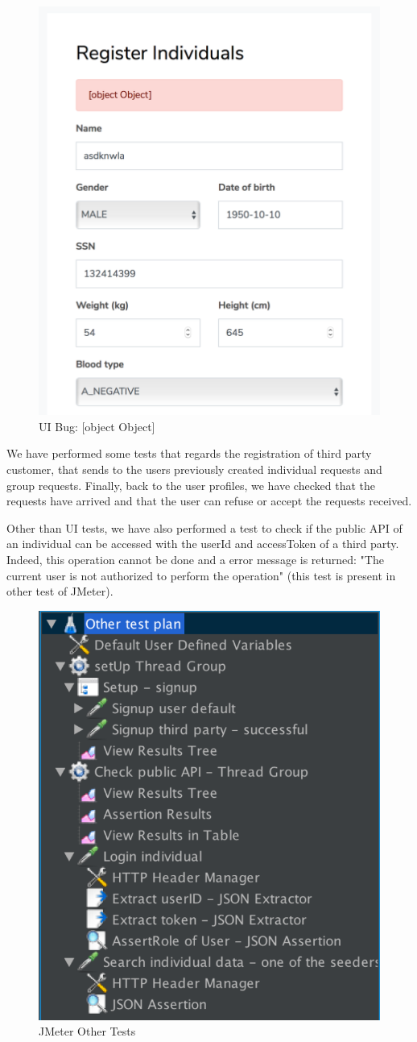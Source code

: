 \begin{figure}[H]
\includegraphics[width=0.7\linewidth]{images/objectError}
\centering
\caption{ UI Bug: [object Object] }
\label{fig:bugobject}
\end{figure}

We have performed some tests that regards the registration of third party customer, that sends to the users previously
created individual requests and group requests. Finally, back to the user profiles, we have checked that the requests have arrived and that
the user can refuse or accept the requests received.\\

\par
Other than UI tests, we have also performed a test to check if the public API of an individual can be accessed with the userId and accessToken of a third party. Indeed, this operation cannot be done and a error message is returned: "The current user is not authorized to perform the operation" (this test is present in other test of JMeter).

\begin{figure}[H]
\includegraphics[width=0.7\linewidth]{images/otherTest}
\centering
\caption{ JMeter Other Tests }
\label{fig:othertest}
\end{figure}
